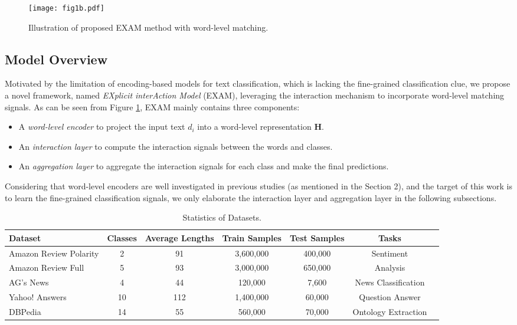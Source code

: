 \documentclass[letterpaper]{article} \usepackage{aaai19}  \usepackage{times}  \usepackage{helvet}  \usepackage{courier}  \usepackage{url}  \usepackage{graphicx}
\begin{document}
\begin{figure}[tbp] \centering  
	\texttt{[image: fig1b.pdf]}   
	\caption{Illustration of proposed EXAM method with word-level matching.} 
    	\label{exama}
\end{figure}
 
\subsection{Model Overview}
Motivated by the limitation of encoding-based models for text classification, which is lacking the fine-grained classification clue, we propose a novel framework, named \textit{EXplicit interAction Model} (EXAM), leveraging the interaction mechanism to incorporate word-level matching signals. As can be seen from Figure \ref{exama}, EXAM mainly contains three components:
\begin{itemize}
\item A \textit{word-level encoder} to project the input text $d_i$ into a word-level representation $\mathbf{H}$.
\item An \textit{interaction layer} to compute the interaction signals between the words and classes.
\item An \textit{aggregation layer} to aggregate the interaction signals for each class and make the final predictions.
\end{itemize}

Considering that word-level encoders are well investigated in previous studies (as mentioned in the Section 2), and the target of this work is to learn the fine-grained classification signals, we only elaborate the interaction layer and aggregation layer in the following subsections.

\begin{table*}
  \caption{Statistics of Datasets.}
  \label{multi-class}
  \centering
\begin{tabular}{lcccccc}
    \toprule
    Dataset  &Classes&Average Lengths&Train Samples&Test Samples&Tasks\\
    \midrule
    Amazon Review Polarity	&2&91 	&3,600,000		&400,000& Sentiment\\
	Amazon Review Full		&5&93 		&3,000,000		&650,000&	 Analysis\\
    \midrule
	AG's News				&4&44 	&120,000		&7,600		&News Classification \\
    \midrule
	Yahoo! Answers			&10&112 &1,400,000		&60,000		&Question Answer \\
    \midrule
	DBPedia					&14&55 	&560,000		&70,000		&Ontology Extraction\\
   
    \bottomrule
  \end{tabular}
\end{table*}
\end{document}
